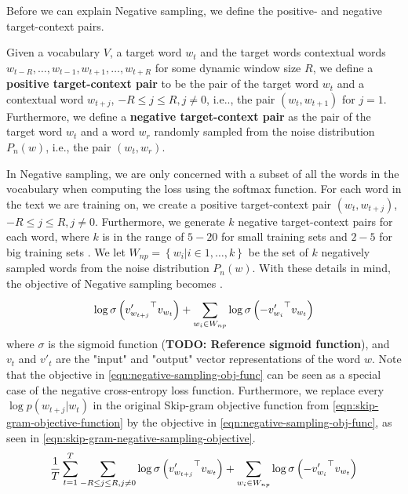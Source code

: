 Before we can explain Negative sampling, we define the positive- and negative target-context pairs.
\begin{definition}
Given a vocabulary $V$, a target word $w_t$ and the target words contextual words $w_{t-R}, \ldots, w_{t-1}, w_{t+1}, \ldots, w_{t+R}$ for some dynamic window size $R$, we define a \textbf{positive target-context pair} to be the pair of the target word $w_t$ and a contextual word $w_{t+j}$, $-R \leq j \leq R, j \neq 0$, i.e.., the pair $\left( w_t, w_{t+1} \right)$ for $j=1$. Furthermore, we define a \textbf{negative target-context pair} as the pair of the target word $w_t$ and a word $w_r$ randomly sampled from the noise distribution $P_n(w)$, i.e., the pair $\left( w_t, w_r \right)$.
\end{definition}


In Negative sampling, we are only concerned with a subset of all the words in the vocabulary when computing the loss using the softmax function. For each word in the text we are training on, we create a positive target-context pair $\left( w_t, w_{t+j} \right)$, $-R \leq j \leq R, j \neq 0$. Furthermore, we generate $k$ negative target-context pairs for each word, where $k$ is in the range of $5-20$ for small training sets and $2-5$ for big training sets \cite{mikolov2013b}. We let $W_{np} = \left \{ w_i | i \in 1, \ldots, k \right \}$ be the set of $k$ negatively sampled words from the noise distribution $P_n(w)$. With these details in mind, the objective of Negative sampling becomes \cite{mikolov2013b, rong2016word2vec}.
\begin{align}
    \log \sigma \left( {v'_{w_{t+j}}}^\top v_{w_t} \right) + \sum\limits_{w_i \in W_{np}}^{} \log \sigma \left( -{v'_{w_i}}^\top v_{w_t} \right)
    \label{eqn:negative-sampling-obj-func}
\end{align}
where $\sigma$ is the sigmoid function (\textbf{TODO: Reference sigmoid function}), and $v_t$ and $v'_t$ are the "input" and "output" vector representations of the word $w$. Note that the objective in \cref{eqn:negative-sampling-obj-func} can be seen as a special case of the negative cross-entropy loss function. Furthermore, we replace every $\log p(w_{t+j} | w_t)$ in the original Skip-gram objective function from \cref{eqn:skip-gram-objective-function} by the objective in \cref{eqn:negative-sampling-obj-func}, as seen in \cref{eqn:skip-gram-negative-sampling-objective}.
\begin{align}
    \frac{1}{T} \sum\limits_{t=1}^{T} \sum\limits_{-R \leq j \leq R, j \neq 0}^{} \log \sigma \left( {v'_{w_{t+j}}}^\top v_{w_t} \right) + \sum\limits_{w_i \in W_{np}}^{} \log \sigma \left( -{v'_{w_i}}^\top v_{w_t} \right)
    \label{eqn:skip-gram-negative-sampling-objective}
\end{align}


